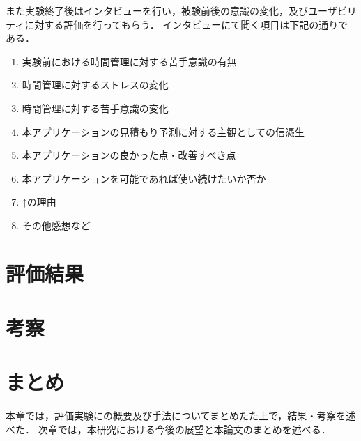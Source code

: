 また実験終了後はインタビューを行い，被験前後の意識の変化，及びユーザビリティに対する評価を行ってもらう．
インタビューにて聞く項目は下記の通りである．%
\begin{enumerate}
  \item 実験前における時間管理に対する苦手意識の有無
  \item 時間管理に対するストレスの変化
  \item 時間管理に対する苦手意識の変化
  \item 本アプリケーションの見積もり予測に対する主観としての信憑生
  \item 本アプリケーションの良かった点・改善すべき点
  \item 本アプリケーションを可能であれば使い続けたいか否か
  \item ↑の理由
  \item その他感想など
\end{enumerate}

\section{評価結果}

\section{考察}

\section{まとめ}
本章では，評価実験にの概要及び手法についてまとめたた上で，結果・考察を述べた．
次章では，本研究における今後の展望と本論文のまとめを述べる．
